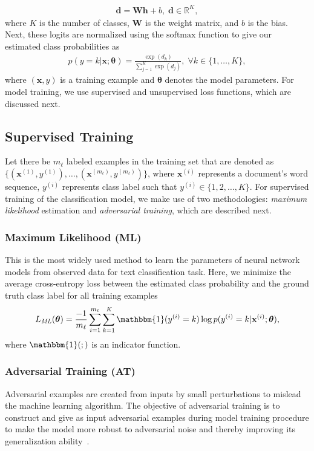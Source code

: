\documentclass[letterpaper]{article}
\newcommand{\citep}{\cite}
\begin{document}
\begin{align*}
\mathbf{d} = \mathbf{W}\mathbf{h} + b,\;\mathbf{d} \in \mathbb{R}^\textit{K},
\end{align*}
where $\textit{K}$ is the number of classes, $\mathbf{W}$ is the weight matrix, and $b$ is the bias. Next, these logits are normalized using the $\mathrm{softmax}$ function to give our estimated class probabilities as
\begin{align*}
p(y=k|\mathbf{x}; \boldsymbol{\theta}) = \frac{\exp(d_{k})}{\sum_{j=1}^{\textit{K}} \exp(d_{j})},\;\forall{k}\in\{1,\ldots,\textit{K}\},
\end{align*}
where $(\mathbf{x}, y)$ is a training example and $\boldsymbol{\theta}$ denotes the model parameters.
For model training, we use supervised and unsupervised loss functions, which are discussed next.

\subsection{Supervised Training}
Let there be $\textit{m}_\ell$ labeled examples in the training set that are denoted as $\{(\mathbf{x}^{(1)},y^{(1)}),\ldots,(\mathbf{x}^{(\textit{m}_\ell)},y^{(\textit{m}_\ell)})\}$, where $\mathbf{x}^{(i)}$ represents a document's word sequence, $y^{(i)}$ represents class label such that $y^{(i)}\in\{1,2,\ldots,K\}$. For supervised training of the classification model, we make use of two methodologies: \emph{maximum likelihood} estimation and \emph{adversarial training}, which are described next.

\subsubsection*{\textbf{Maximum Likelihood (ML)}} This is the most widely used method to learn the parameters of neural network models from observed data for text classification task. Here, we minimize the average cross-entropy loss between the estimated class probability and the ground truth class label for all training examples
\begin{align*}
L_{\textit{ML}}(\boldsymbol\theta) = \frac{-1}{m_{\ell}}\sum_{i=1}^{m_{\ell}} \sum_{k=1}^{\textit{K}} \mathbbm{1}(y^{(i)}=k)\log{p(y^{(i)}=k|\mathbf{x}^{(i)}; \boldsymbol{\theta})},
\end{align*}
where $\mathbbm{1}(;)$ is an indicator function.

\subsubsection*{\textbf{Adversarial Training (AT)}} Adversarial examples are created from inputs by small perturbations to mislead the machine learning algorithm. The objective of adversarial training is to construct and give as input adversarial examples during model training procedure to make the model more robust to adversarial noise and thereby improving its generalization ability~\citep{goodfellow2014explaining}. 
\end{document}
